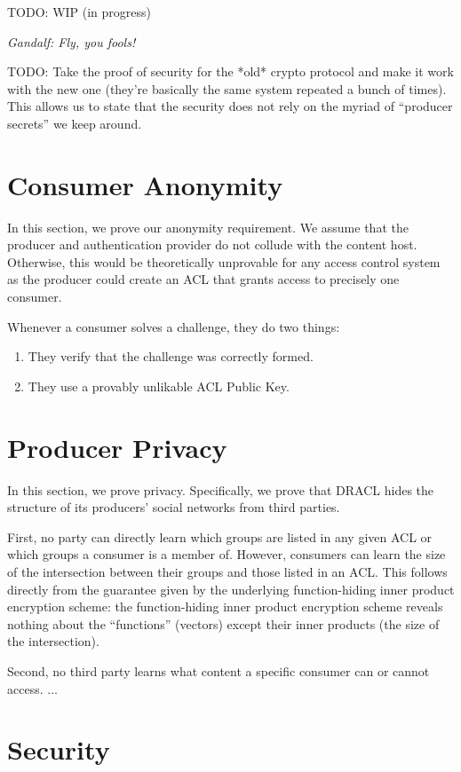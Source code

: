 \documentclass[pdftex,12pt,a4papaer,twoside,notitlepage]{report}
\begin{document}
TODO: WIP (in progress)

\emph{Gandalf: Fly, you fools!}

TODO: Take the proof of security for the *old* crypto protocol and make it work
with the new one (they're basically the same system repeated a bunch of times).
This allows us to state that the security does not rely on the myriad of
``producer secrets'' we keep around.

\section{Consumer Anonymity}

In this section, we prove our anonymity requirement. We assume that the producer
and authentication provider do not collude with the content host. Otherwise,
this would be theoretically unprovable for any access control system as the
producer could create an ACL that grants access to precisely one consumer.

Whenever a consumer solves a challenge, they do two things:

\begin{enumerate}
\item They verify that the challenge was correctly formed.
\item They use a provably unlikable ACL Public Key.
\end{enumerate}

\section{Producer Privacy}

In this section, we prove privacy. Specifically, we prove that DRACL hides the
structure of its producers' social networks from third parties.

First, no party can directly learn which groups are listed in any given ACL or
which groups a consumer is a member of. However, consumers can learn the size of
the intersection between their groups and those listed in an ACL. This follows
directly from the guarantee given by the underlying function-hiding inner
product encryption scheme: the function-hiding inner product encryption scheme
reveals nothing about the ``functions'' (vectors) except their inner products
(the size of the intersection).

Second, no third party learns what content a specific consumer can or cannot
access. ...

\section{Security}
\end{document}
